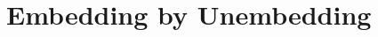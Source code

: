 \documentclass[uplatex]{sumiilab-paper}
\theoremstyle{mystyle}
\newtheorem{definition}{定義}
\newtheorem{theorem}[definition]{定理}
\newtheorem{corollary}[definition]{系}
\newtheorem{proposition}[definition]{命題}
\newtheorem{lemma}[definition]{補題}
\newtheorem{example}[definition]{例}
\newtheorem{assumption}[definition]{仮定}
\newtheorem{axiom}[definition]{公理}
\numberwithin{definition}{chapter} %
\begin{document}
\section{Embedding by Unembedding}













\end{document}
